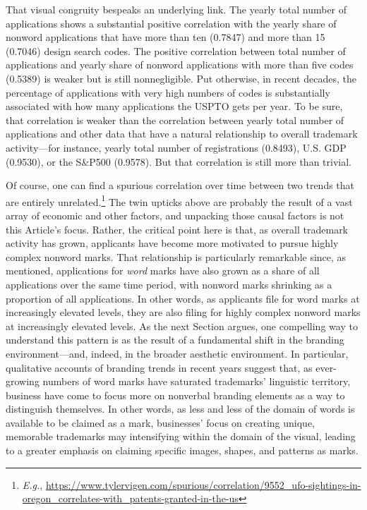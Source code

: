 \documentclass[letterpaper, 11pt, oneside]{article}
\begin{document}
That visual congruity bespeaks an underlying link. The yearly total number of applications shows a substantial positive correlation with the yearly share of nonword applications that have more than ten (0.7847) and more than 15 (0.7046) design search codes. The positive correlation between total number of applications and yearly share of nonword applications with more than five codes (0.5389) is weaker but is still nonnegligible. Put otherwise, in recent decades, the percentage of applications with very high numbers of codes is substantially associated with how many applications the USPTO gets per year. To be sure, that correlation is weaker than the correlation between yearly total number of applications and other data that have a natural relationship to overall trademark activity—for instance, yearly total number of registrations (0.8493), U.S. GDP (0.9530), or the S\&P500 (0.9578). But that correlation is still more than trivial.

Of course, one can find a spurious correlation over time between two trends that are entirely unrelated.\footnote{\textit{E.g.}, \url{https://www.tylervigen.com/spurious/correlation/9552_ufo-sightings-in-oregon_correlates-with_patents-granted-in-the-us}} The twin upticks above are probably the result of a vast array of economic and other factors, and unpacking those causal factors is not this Article's focus. Rather, the critical point here is that, as overall trademark activity has grown, applicants have become more motivated to pursue highly complex nonword marks. That relationship is particularly remarkable since, as mentioned, applications for \emph{word} marks have also grown as a share of all applications over the same time period, with nonword marks shrinking as a proportion of all applications. In other words, as applicants file for word marks at increasingly elevated levels, they are also filing for highly complex nonword marks at increasingly elevated levels. As the next Section argues, one compelling way to understand this pattern is as the result of a fundamental shift in the branding environment—and, indeed, in the broader aesthetic environment. In particular, qualitative accounts of branding trends in recent years suggest that, as ever-growing numbers of word marks have saturated trademarks' linguistic territory, business have come to focus more on nonverbal branding elements as a way to distinguish themselves. In other words, as less and less of the domain of words is available to be claimed as a mark, businesses' focus on creating unique, memorable trademarks may intensifying within the domain of the visual, leading to a greater emphasis on claiming specific images, shapes, and patterns as marks.
\end{document}
